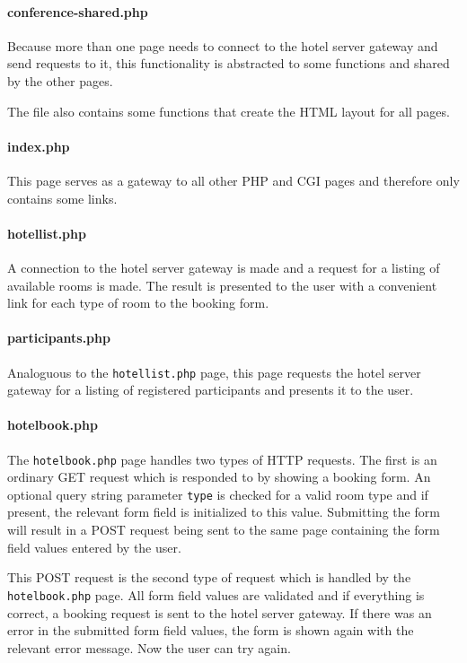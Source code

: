 \documentclass[a4paper,10pt]{article}
\begin{document}
\paragraph{conference-shared.php}
Because more than one page needs to connect to the hotel server gateway and
send requests to it, this functionality is abstracted to some functions and
shared by the other pages.

The file also contains some functions that create the HTML layout for all
pages.

\paragraph{index.php}
This page serves as a gateway to all other PHP and CGI pages and therefore
only contains some links.

\paragraph{hotellist.php}
A connection to the hotel server gateway is made and a request for a listing
of available rooms is made. The result is presented to the user with a
convenient link for each type of room to the booking form.

\paragraph{participants.php}
Analoguous to the \texttt{hotellist.php} page, this page requests the hotel
server gateway for a listing of registered participants and presents it to
the user.

\paragraph{hotelbook.php}
The \texttt{hotelbook.php} page handles two types of HTTP requests. The first
is an ordinary \textsc{GET} request which is responded to by showing a booking
form. An optional query string parameter \texttt{type} is checked for a valid
room type and if present, the relevant form field is initialized to this value.
Submitting the form will result in a \textsc{POST} request being sent to the same
page containing the form field values entered by the user.

This \textsc{POST} request is the second type of request which is handled by
the \texttt{hotelbook.php} page. All form field values are validated and if
everything is correct, a booking request is sent to the hotel server gateway. If
there was an error in the submitted form field values, the form is shown again
with the relevant error message. Now the user can try again.
\end{document}
